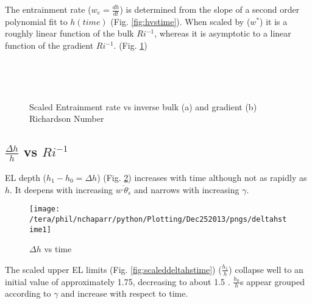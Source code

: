 The entrainment rate ($w_{e}= \frac{dh}{dt}$) is determined from the slope of a second order polynomial fit to $h(time)$ (Fig. \ref{fig:hvstime}).  When scaled by ($w^{*}$) it is a roughly linear function 
of the bulk $Ri^{-1}$, whereas it is asymptotic to a linear function of the gradient $Ri^{-1}$. (Fig. \ref{fig:scaledweinvri})\\    

\begin{figure}[htbp]
\begin{minipage}[b]{0.5\linewidth}
        \\
        \end{minipage}             
\quad
\begin{minipage}[b]{0.5\linewidth}
        \\
       
       \end{minipage}
        \caption{Scaled Entrainment rate vs inverse bulk (a)  and gradient (b) Richardson Number}
        \label{fig:scaledweinvri}
\end{figure}

\subsection{$\frac{\Delta h}{h}$ vs $Ri^{-1}$}
\FloatBarrier

EL depth ($h_{1}-h_{0}=\Delta h$) (Fig. \ref{fig:deltahvstime1}) increases with time
although not as rapidly as $h$.  It deepens with increasing $\overline{w^{,}\theta^{,}_{s}}$ 
and narrows with increasing $\gamma$. \\

\begin{figure}[htbp]
    \centering
    \texttt{[image: /tera/phil/nchaparr/python/Plotting/Dec252013/pngs/deltahstime1]}
    \caption{$\Delta h$ vs time}
    \label{fig:deltahvstime1}   %
\end{figure}

The scaled upper EL limits (Fig. \ref{fig:scaleddeltahstime}) ($\frac{h_{1}}{h}$) collapse well 
to an initial value of approximately 1.75, decreasing to about 1.5 .  $\frac{h_{0}}{h}$s appear 
grouped according to $\gamma$ and increase with respect to time.\\  

